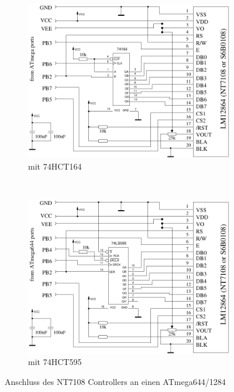 \begin{figure}[H]
  \begin{subfigure}[b]{.5\textwidth}	%
    \centering
    \includegraphics[width=.88\textwidth]{../FIG/ST7108serial164_644.pdf}	%
    \caption{mit 74HCT164}
  \end{subfigure}
  ~
  \begin{subfigure}[b]{.5\textwidth}	%
    \centering
    \includegraphics[width=.88\textwidth]{../FIG/ST7108serial595_644.pdf}	%
    \caption{mit 74HCT595}
  \end{subfigure}
  \caption{Anschluss des NT7108 Controllers an einen ATmega644/1284}
  \label{fig:NT7108lcd_644}
\end{figure}

